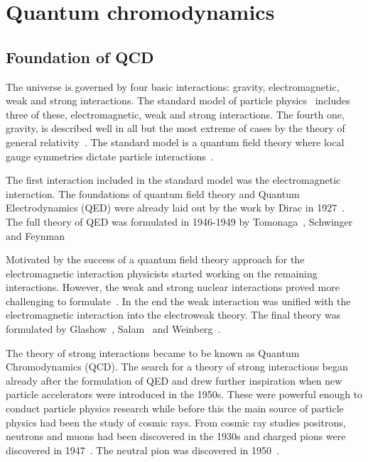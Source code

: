 \pagebreak
\section{Quantum chromodynamics}
\subsection{Foundation of QCD}
The universe is governed by four basic interactions: gravity, electromagnetic, weak and strong interactions. The standard model of particle physics~\cite{Tanabashi:2018oca} includes three of these, electromagnetic, weak and strong interactions.  The fourth one, gravity, is described well in all but the most extreme of cases by the theory of general relativity~\cite{Einstein1915}. The standard model is a quantum field theory where local gauge symmetries dictate  particle interactions~\cite{Perkins:1982xb}. 

The first interaction included in the standard model was the electromagnetic interaction. The foundations of quantum field theory and Quantum Electrodynamics (QED) were already laid out by the work by Dirac in 1927~\cite{doi:10.1098/rspa.1927.0039}. The full theory of QED was formulated in 1946-1949 by Tomonaga~\cite{Tomonaga:1946zz},  Schwinger~\cite{Schwinger:1948yj,Schwinger:1948yk} and Feynman~\cite{Feynman:1948fi}%

Motivated by the success of a quantum field theory approach for the electromagnetic interaction physicists started working on the remaining interactions. However, the weak and strong nuclear interactions proved more challenging to formulate~\cite{Krauss:2017}. In the end the weak interaction was unified with the electromagnetic interaction into the electroweak theory. The final theory was formulated by Glashow~\cite{Glashow:1970gm}, Salam~\cite{Salam:1964ry} and Weinberg~\cite{Weinberg:1967tq}.

The theory of strong interactions became to be known as Quantum Chromodynamics (QCD). The search for a theory of strong interactions began already after the formulation of QED and drew further inspiration when new particle accelerators were introduced in the 1950s. These were powerful enough to conduct particle physics research while before this the main source of particle physics had been the study of cosmic rays. From cosmic ray studies positrons, neutrons and muons had been discovered in the 1930s and charged pions were discovered in 1947~\cite{Occhialini:1987nr,Lattes:1947mx}. The neutral pion was discovered in 1950~\cite{Bjorklund:1950}.

